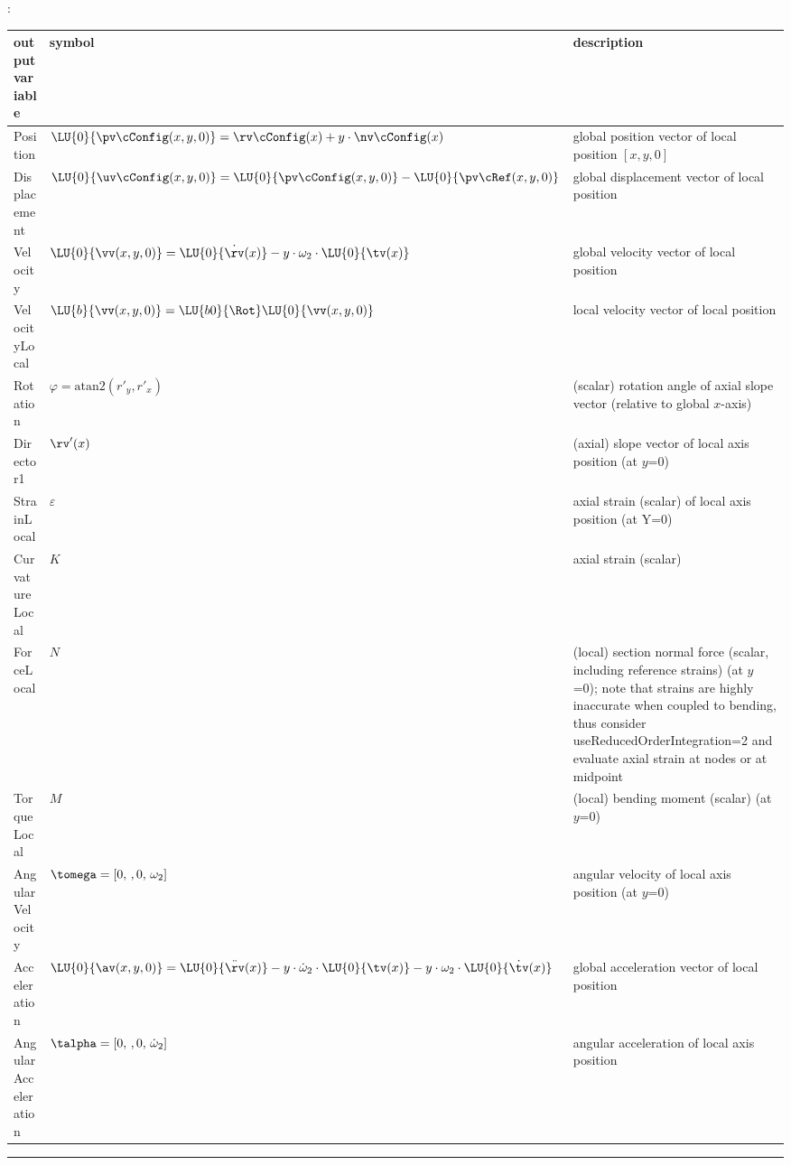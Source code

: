 :
\begin{center}
\footnotesize
\begin{longtable}{| p{5cm} | p{5cm} | p{6cm} |} 
\hline
\bf output variable & \bf symbol & \bf description \\ \hline
Position & $\LU{0}{\pv\cConfig(x,y,0)} = \rv\cConfig(x) + y\cdot \nv\cConfig(x)$ & global position vector of local position $[x,y,0]$\\ \hline
Displacement & $\LU{0}{\uv\cConfig(x,y,0)} = \LU{0}{\pv\cConfig(x,y,0)} - \LU{0}{\pv\cRef(x,y,0)}$ & global displacement vector of local position\\ \hline
Velocity & $\LU{0}{\vv(x,y,0)} = \LU{0}{\dot \rv(x)} - y \cdot \omega_2 \cdot\LU{0}{\tv(x)} $ & global velocity vector of local position\\ \hline
VelocityLocal & $\LU{b}{\vv(x,y,0)} = \LU{b0}{\Rot}\LU{0}{\vv(x,y,0)}$ & local velocity vector of local position\\ \hline
Rotation & $\varphi = \mathrm{atan2}(r'_y, r'_x)$ & (scalar) rotation angle of axial slope vector (relative to global $x$-axis)\\ \hline
Director1 & $\rv'(x)$ & (axial) slope vector of local axis position (at $y$=0)\\ \hline
StrainLocal & $\varepsilon$ & axial strain (scalar) of local axis position (at Y=0)\\ \hline
CurvatureLocal & $K$ & axial strain (scalar)\\ \hline
ForceLocal & $N$ &  (local) section normal force (scalar, including reference strains) (at $y$=0); note that strains are highly inaccurate when coupled to bending, thus consider useReducedOrderIntegration=2 and evaluate axial strain at nodes or at midpoint\\ \hline
TorqueLocal & $M$ &  (local) bending moment (scalar) (at $y$=0)\\ \hline
AngularVelocity & $\tomega = [0,\, ,0,\, \omega_2]$ & angular velocity of local axis position (at $y$=0)\\ \hline
Acceleration & $\LU{0}{\av(x,y,0)} = \LU{0}{\ddot \rv(x)} - y \cdot \dot\omega_2 \cdot\LU{0}{\tv(x)}- y \cdot \omega_2 \cdot\LU{0}{\dot\tv(x)} $ & global acceleration vector of local position\\ \hline
AngularAcceleration & $\talpha = [0,\, ,0,\, \dot\omega_2]$ & angular acceleration of local axis position\\ \hline
\end{longtable}
\end{center}
\par\noindent\rule{\textwidth}{0.4pt}
\label{description_ObjectANCFCable2D}
